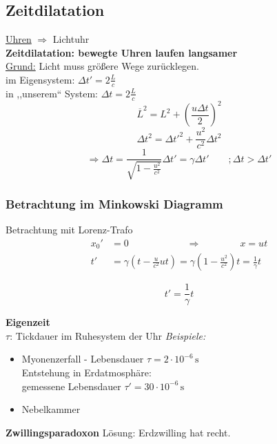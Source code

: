 \documentclass[titlepage,11pt,a4paper,ngerman]{report}
\newcommand{\tx}[1]{\textrm{#1}}
\newcommand{\lcom}[1]{\color{MidnightBlue}#1\color{black}}
\newcommand{\frbox}[2]{\begin{tcolorbox}[colback=white,colframe=red!75!black,fonttitle=\bfseries,title=#1]#2\end{tcolorbox}}
\begin{document}
\subsection{Zeitdilatation}
\underline{Uhren} $ \Rightarrow $ Lichtuhr\\
\textbf{Zeitdilatation: bewegte Uhren laufen langsamer}\\
\underline{Grund:} Licht muss größere Wege zurücklegen.\\[5pt]
im Eigensystem: $ \Delta t' = 2 \frac{L}{c} $\\
in ,,unserem`` System: $ \Delta t = 2 \frac{L}{c} $
\begin{equation*}
\overline{L}^2 = L^2 + \left(\frac{u \Delta t}{2}\right)^2
\end{equation*}
\begin{equation*}
\Delta t^2 = \Delta t'^2 + \frac{u^2}{c^2} \Delta t^2
\end{equation*}
\begin{equation*}
\Rightarrow \Delta t = \frac{1}{\sqrt{1 - \frac{u^2}{c^2}}} \Delta t' = \gamma \Delta t' \qquad ; \Delta t > \Delta t'
\end{equation*}

\subsubsection{Betrachtung im Minkowski Diagramm}
Betrachtung mit Lorenz-Trafo
\begin{align*}
x_0' &= 0 \qquad  \qquad \qquad  \Rightarrow  \qquad \qquad  x = ut \\
t'\phantom{_0} &= \gamma \left(t - \frac{u}{c^2}  u t\right) = \gamma \left(1 - \frac{u^2}{c^2}\right) t = \frac{1}{\gamma} t
\end{align*}
\frbox{Zeitdilatation}{\begin{equation*}
	t' = \frac{1}{\gamma} t
	\end{equation*}}
\textbf{Eigenzeit}\\
$ \tau $: Tickdauer im Ruhesystem der Uhr
\emph{Beispiele:}
\begin{itemize}
	\item Myonenzerfall - Lebensdauer $ \tau = 2 \cdot 10^{-6} \, \tx{s} $\\
	Entstehung in Erdatmosphäre:\\
	gemessene Lebensdauer $ \tau' = 30 \cdot 10^{-6} \, \tx{s} $
	\item Nebelkammer
\end{itemize}

\textbf{Zwillingsparadoxon}
Lösung: \lcom{Erdzwilling hat recht.}
\end{document}
